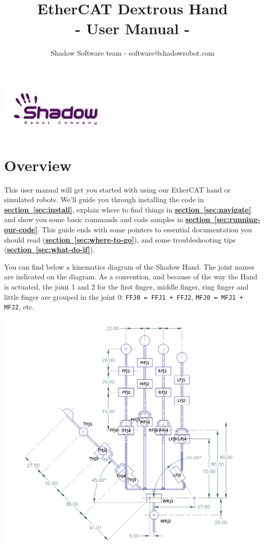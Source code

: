 \documentclass[12pt]{article}
\title{\textbf{EtherCAT Dextrous Hand} \\
- User Manual -}
\author{Shadow Software team - software@shadowrobot.com}
\newcommand{\link}[1]{\hyperref[sec:#1]{\textbf{section~\ref*{sec:#1}}}}
\begin{document}
\begin{titlepage}

\maketitle
\vspace{5cm}
\begin{center}
\includegraphics{images/logo-shadowDB.png}
\end{center}
\end{titlepage}

\tableofcontents
\newpage

\section{Overview}
\label{sec:overview}

\par This user manual will get you started with using our EtherCAT hand or simulated robots. We'll guide you through installing the code in \link{install}, explain where to find things in \link{navigate} and show you some basic commands and code samples in \link{running-our-code}. This guide ends with some pointers to essential documentation you should read (\link{where-to-go}), and some troubleshooting tips (\link{what-do-if}). \\

\par You can find below a kinematics diagram of the Shadow Hand. The joint names are indicated on the diagram. As a convention, and because of the way the Hand is actuated, the joint 1 and 2 for the first finger, middle finger, ring finger and little finger are grouped in the joint 0: \texttt{FFJ0 = FFJ1 + FFJ2}, \texttt{MFJ0 = MFJ1 + MFJ2}, etc.

\includegraphics[width=\textwidth]{images/Hand_Kin_annotated.png}
\end{document}
